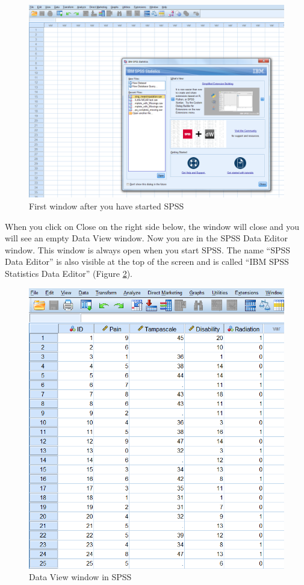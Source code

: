 \documentclass[]{book}
\theoremstyle{definition}
\theoremstyle{definition}
\theoremstyle{definition}
\theoremstyle{remark}
\begin{document}
\begin{figure}

{\centering \includegraphics[width=0.9\linewidth]{images/fig1.1} 

}

\caption{First window after you have started SPSS}\label{fig:fig1}
\end{figure}

When you click on Close on the right side below, the window will close
and you will see an empty Data View window. Now you are in the SPSS Data
Editor window. This window is always open when you start SPSS. The name
``SPSS Data Editor'' is also visible at the top of the screen and is
called ``IBM SPSS Statistics Data Editor'' (Figure \ref{fig:fig2}).

\begin{figure}

{\centering \includegraphics[width=0.9\linewidth]{images/fig1.2} 

}

\caption{Data View window in SPSS}\label{fig:fig2}
\end{figure}
\end{document}
